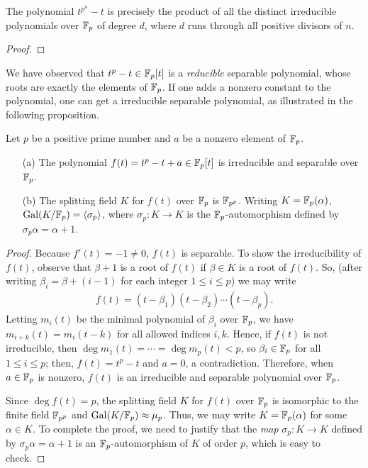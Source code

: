 \color{red}
\begin{prop}
    The polynomial $t^{p^n}-t$ is precisely the product of all the distinct irreducible polynomials over ${\mathbb{F}}_p$ of degree $d$, where $d$ runs through all positive divisors of $n$.
\end{prop}
\begin{proof}
    
\end{proof}
\color{black}

We have observed that $t^p-t\in{\mathbb{F}}_p[t]$ is a \textit{reducible} separable polynomial, whose roots are exactly the elements of ${\mathbb{F}}_p$.
If one adds a nonzero constant to the polynomial, one can get a irreducible separable polynomial, as illustrated in the following proposition.
\begin{prop}
    Let $p$ be a positive prime number and $a$ be a nonzero element of ${\mathbb{F}}_p$.
    \begin{enumerate}
        \item[(a)]
        {
            The polynomial $f(t)=t^p-t+a\in{\mathbb{F}}_p[t]$ is irreducible and separable over ${\mathbb{F}}_p$.
        }
        \item[(b)]
        {
            The splitting field $K$ for $f(t)$ over ${\mathbb{F}}_p$ is ${\mathbb{F}}_{p^p}$.
            Writing $K={\mathbb{F}}_p(\alpha)$, ${\textrm{Gal}({K/{\mathbb{F}}_p})}={\left\langle{\sigma_p}\right\rangle}$, where $\sigma_p: K\rightarrow K$ is the ${\mathbb{F}}_p$-automorphism defined by $\sigma_p\alpha=\alpha+1$.
        }
    \end{enumerate}
\end{prop}
\begin{proof}
    Because $f'(t)=-1\neq 0$, $f(t)$ is separable.
    To show the irreducibility of $f(t)$, observe that $\beta+1$ is a root of $f(t)$ if $\beta\in K$ is a root of $f(t)$.
    So, (after writing $\beta_i=\beta+(i-1)$ for each integer $1\leq i\leq p$) we may write
    \begin{align*}
        f(t)=(t-\beta_1)(t-\beta_2)\cdots(t-\beta_p).
    \end{align*}
    Letting $m_i(t)$ be the minimal polynomial of $\beta_i$ over ${\mathbb{F}}_p$, we have $m_{i+k}(t)=m_i(t-k)$ for all allowed indices $i, k$.
    Hence, if $f(t)$ is not irreducible, then $\deg m_1(t)=\cdots=\deg m_p(t)<p$, so $\beta_i\in{\mathbb{F}}_p$ for all $1\leq i\leq p$; then, $f(t)=t^p-t$ and $a=0$, a contradiction.
    Therefore, when $a\in{\mathbb{F}}_p$ is nonzero, $f(t)$ is an irreducible and separable polynomial over ${\mathbb{F}}_p$.

    Since $\deg f(t)=p$, the splitting field $K$ for $f(t)$ over ${\mathbb{F}}_p$ is isomorphic to the finite field ${\mathbb{F}}_{p^p}$ and ${\textrm{Gal}({K/{\mathbb{F}}_p})}\approx\mu_p$.
    Thus, we may write $K={\mathbb{F}}_p(\alpha)$ for some $\alpha\in K$.
    To complete the proof, we need to justify that the \textit{map} $\sigma_p: K\rightarrow K$ defined by $\sigma_p\alpha=\alpha+1$ is an ${\mathbb{F}}_p$-automorphism of $K$ of order $p$, \color{brown}which is easy to check\color{black}.
\end{proof}
